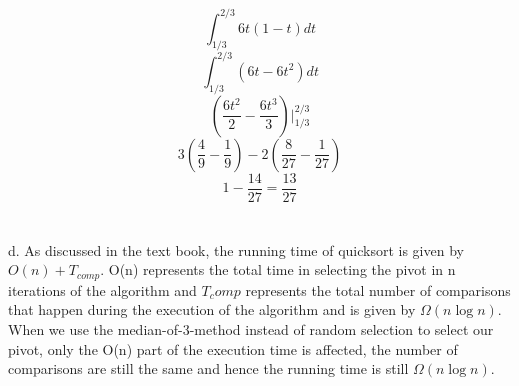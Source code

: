 \documentclass[10pt]{article}
\begin{document}
$$\int_{1/3}^{2/3}6t(1-t)dt$$
$$\int_{1/3}^{2/3}(6t- 6t^2)dt$$
$$(\dfrac{6t^2}{2} - \dfrac{6t^3}{3})\Big|_{1/3}^{2/3}$$
$$3(\dfrac{4}{9}-\dfrac{1}{9})-2(\dfrac{8}{27}-\dfrac{1}{27})$$
$$1 - \dfrac{14}{27} = \dfrac{13}{27}$$\\\\
d. As discussed in the text book, the running time of quicksort is given by $O(n) + T_{comp}$. O(n) represents the total time in selecting the pivot in n iterations of the algorithm and $T_comp$ represents the total number of comparisons that happen during the execution of the algorithm and is given by $\Omega(n \log n)$. When we use the median-of-3-method instead of random selection to select our pivot, only the O(n) part of the execution time is affected, the number of comparisons are still the same and hence the running time is still $\Omega(n \log n).$
\newpage
\end{document}
